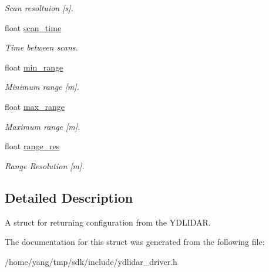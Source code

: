 \begin{DoxyCompactItemize}
\begin{DoxyCompactList}\small\item\em Scan resoltuion \mbox{[}s\mbox{]}. \end{DoxyCompactList}\item 
float \hyperlink{struct_laser_config_af40c5e3902bb931e337ea400682e5636}{scan\+\_\+time}\hypertarget{struct_laser_config_af40c5e3902bb931e337ea400682e5636}{}\label{struct_laser_config_af40c5e3902bb931e337ea400682e5636}

\begin{DoxyCompactList}\small\item\em Time between scans. \end{DoxyCompactList}\item 
float \hyperlink{struct_laser_config_a262652da08f505f112be9e017fb43a43}{min\+\_\+range}\hypertarget{struct_laser_config_a262652da08f505f112be9e017fb43a43}{}\label{struct_laser_config_a262652da08f505f112be9e017fb43a43}

\begin{DoxyCompactList}\small\item\em Minimum range \mbox{[}m\mbox{]}. \end{DoxyCompactList}\item 
float \hyperlink{struct_laser_config_a977dcea9a68dc9dd21113fd0eff24c9c}{max\+\_\+range}\hypertarget{struct_laser_config_a977dcea9a68dc9dd21113fd0eff24c9c}{}\label{struct_laser_config_a977dcea9a68dc9dd21113fd0eff24c9c}

\begin{DoxyCompactList}\small\item\em Maximum range \mbox{[}m\mbox{]}. \end{DoxyCompactList}\item 
float \hyperlink{struct_laser_config_ae52eb0e0aca41f6dde58700a642e4c80}{range\+\_\+res}\hypertarget{struct_laser_config_ae52eb0e0aca41f6dde58700a642e4c80}{}\label{struct_laser_config_ae52eb0e0aca41f6dde58700a642e4c80}

\begin{DoxyCompactList}\small\item\em Range Resolution \mbox{[}m\mbox{]}. \end{DoxyCompactList}\end{DoxyCompactItemize}


\subsection{Detailed Description}
A struct for returning configuration from the Y\+D\+L\+I\+D\+AR. 

The documentation for this struct was generated from the following file\+:\begin{DoxyCompactItemize}
\item 
/home/yang/tmp/sdk/include/ydlidar\+\_\+driver.\+h\end{DoxyCompactItemize}
